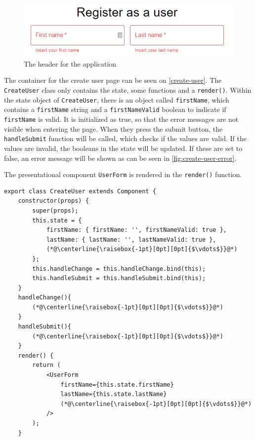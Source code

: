 \begin{figure}[H]
    \includegraphics[width=\linewidth]{figures/create-user-error.png}
    \caption{The header for the application}
    \label{fig:create-user-error}
\end{figure}

The container for the create user page can be seen on \autoref{create-user}.
The \texttt{CreateUser} class only contains the state, some functions and a \texttt{render()}.
Within the state object of \texttt{CreateUser}, there is an object called \texttt{firstName}, which contains a \texttt{firstName} string and a \texttt{firstNameValid} boolean to indicate if \texttt{firstName} is valid.
It is initialized as true, so that the error messages are not visible when entering the page.
When they press the submit button, the \texttt{handleSubmit} function will be called, which checks if the values are valid.
If the values are invalid, the booleans in the state will be updated. 
If these are set to false, an error message will be shown as can be seen in \autoref{fig:create-user-error}.

The presentational component \texttt{UserForm} is rendered in the \texttt{render()} function. 
\begin{lstlisting}[caption={Component to create user}, captionpos=b, label={create-user}]
export class CreateUser extends Component {
    constructor(props) {
        super(props);
        this.state = {
            firstName: { firstName: '', firstNameValid: true },
            lastName: { lastName: '', lastNameValid: true },
            (*@\centerline{\raisebox{-1pt}[0pt][0pt]{$\vdots$}}@*)
        };
        this.handleChange = this.handleChange.bind(this);
        this.handleSubmit = this.handleSubmit.bind(this);
    }
    handleChange(){
        (*@\centerline{\raisebox{-1pt}[0pt][0pt]{$\vdots$}}@*)
    }
    handleSubmit(){
        (*@\centerline{\raisebox{-1pt}[0pt][0pt]{$\vdots$}}@*)
    }
    render() {
        return (
            <UserForm
                firstName={this.state.firstName}
                lastName={this.state.lastName}
                (*@\centerline{\raisebox{-1pt}[0pt][0pt]{$\vdots$}}@*)
            />
        );
    }
\end{lstlisting}


